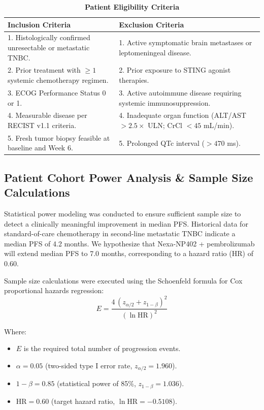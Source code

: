 \documentclass[10pt,a4paper]{article}
\begin{document}
\begin{table}[htbp]
\caption{\textbf{Patient Eligibility Criteria}}
\vspace{-0.4em}
\small
\begin{tabularx}{\textwidth}{X X}
\toprule
\rowcolor{HeaderBg} \textbf{\color{PrimaryNavy}Inclusion Criteria} & \textbf{\color{PrimaryNavy}Exclusion Criteria} \\
\midrule
1. Histologically confirmed unresectable or metastatic TNBC. & 1. Active symptomatic brain metastases or leptomeningeal disease. \\
2. Prior treatment with $\ge 1$ systemic chemotherapy regimen. & 2. Prior exposure to STING agonist therapies. \\
3. ECOG Performance Status 0 or 1. & 3. Active autoimmune disease requiring systemic immunosuppression. \\
4. Measurable disease per RECIST v1.1 criteria. & 4. Inadequate organ function (ALT/AST $> 2.5\times$ ULN; CrCl $< 45$ mL/min). \\
5. Fresh tumor biopsy feasible at baseline and Week 6. & 5. Prolonged QTc interval ($> 470$ ms). \\
\bottomrule
\end{tabularx}
\end{table}

\subsection{Patient Cohort Power Analysis \& Sample Size Calculations}
Statistical power modeling was conducted to ensure sufficient sample size to detect a clinically meaningful improvement in median PFS. Historical data for standard-of-care chemotherapy in second-line metastatic TNBC indicate a median PFS of 4.2 months. We hypothesize that Nexa-NP402 + pembrolizumab will extend median PFS to 7.0 months, corresponding to a hazard ratio ($\text{HR}$) of 0.60.

Sample size calculations were executed using the Schoenfeld formula for Cox proportional hazards regression:
\begin{equation}
  E = \frac{4 \, (z_{\alpha/2} + z_{1-\beta})^2}{(\ln \text{HR})^2}
\end{equation}

Where:
\begin{itemize}[leftmargin=1.5em, topsep=1pt, itemsep=1pt]
  \item $E$ is the required total number of progression events.
  \item $\alpha = 0.05$ (two-sided type I error rate, $z_{\alpha/2} = 1.960$).
  \item $1-\beta = 0.85$ (statistical power of 85\%, $z_{1-\beta} = 1.036$).
  \item $\text{HR} = 0.60$ (target hazard ratio, $\ln \text{HR} = -0.5108$).
\end{itemize}
\end{document}
